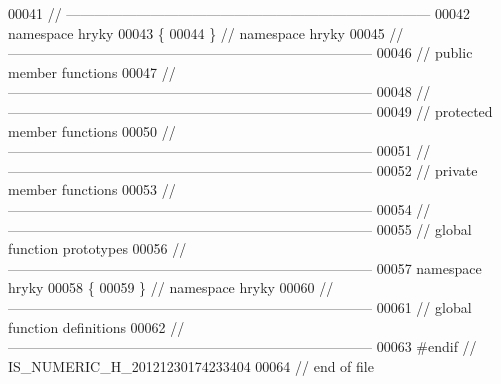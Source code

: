 \begin{DoxyCode}
00041 \textcolor{comment}{//
      ------------------------------------------------------------------------------}
00042 \textcolor{keyword}{namespace }hryky
00043 \{
00044 \} \textcolor{comment}{// namespace hryky}
00045 \textcolor{comment}{//
      ------------------------------------------------------------------------------}
00046 \textcolor{comment}{// public member functions}
00047 \textcolor{comment}{//
      ------------------------------------------------------------------------------}
00048 \textcolor{comment}{//
      ------------------------------------------------------------------------------}
00049 \textcolor{comment}{// protected member functions}
00050 \textcolor{comment}{//
      ------------------------------------------------------------------------------}
00051 \textcolor{comment}{//
      ------------------------------------------------------------------------------}
00052 \textcolor{comment}{// private member functions}
00053 \textcolor{comment}{//
      ------------------------------------------------------------------------------}
00054 \textcolor{comment}{//
      ------------------------------------------------------------------------------}
00055 \textcolor{comment}{// global function prototypes}
00056 \textcolor{comment}{//
      ------------------------------------------------------------------------------}
00057 \textcolor{keyword}{namespace }hryky
00058 \{
00059 \} \textcolor{comment}{// namespace hryky}
00060 \textcolor{comment}{//
      ------------------------------------------------------------------------------}
00061 \textcolor{comment}{// global function definitions}
00062 \textcolor{comment}{//
      ------------------------------------------------------------------------------}
00063 \textcolor{preprocessor}{#endif // IS\_NUMERIC\_H\_20121230174233404}
00064 \textcolor{preprocessor}{}\textcolor{comment}{// end of file}
\end{DoxyCode}
